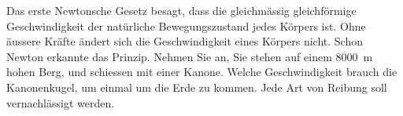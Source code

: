 
\begin{aufgabe}
	Das erste Newtonsche Gesetz besagt, dass die gleichmässig gleichförmige Geschwindigkeit der natürliche Bewegungszustand
	jedes Körpers ist. Ohne äussere Kräfte ändert sich die Geschwindigkeit eines Körpers nicht.
	Schon Newton erkannte das Prinzip. Nehmen Sie an, Sie stehen auf einem \SI{8000}{m} hohen Berg, und schiessen mit
	einer Kanone. Welche Geschwindigkeit brauch die Kanonenkugel, um einmal um die Erde zu kommen.
	Jede Art von Reibung soll vernachlässigt werden.
\end{aufgabe}
\begin{center}
\end{center}
\begin{loesung}

\end{loesung}
